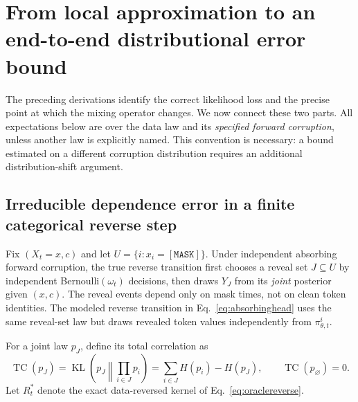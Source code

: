 \documentclass{article}
\theoremstyle{remark}\newtheorem{remark}[theorem]{Remark}
\newcommand{\KL}{\operatorname{KL}}
\newcommand{\mask}{\mathtt{[MASK]}}
\begin{document}
\section{From local approximation to an end-to-end distributional error bound}
\label{sec:endtoend}
The preceding derivations identify the correct likelihood loss and the precise point at which the mixing operator changes. We now connect these two parts. All expectations below are over the data law and its \emph{specified forward corruption}, unless another law is explicitly named. This convention is necessary: a bound estimated on a different corruption distribution requires an additional distribution-shift argument.

\subsection{Irreducible dependence error in a finite categorical reverse step}
Fix $(X_t=x,c)$ and let $U=\{i:x_i=\mask\}$. Under independent absorbing forward corruption, the true reverse transition first chooses a reveal set $J\subseteq U$ by independent Bernoulli$(\omega_t)$ decisions, then draws $Y_J$ from its \emph{joint} posterior given $(x,c)$. The reveal events depend only on mask times, not on clean token identities. The modeled reverse transition in Eq.~\eqref{eq:absorbinghead} uses the same reveal-set law but draws revealed token values independently from $\pi_{\theta,t}^i$.

For a joint law $p_J$, define its total correlation as
\begin{equation}
 \operatorname{TC}(p_J)=\KL\left(p_J\middle\Vert\prod_{i\in J}p_i\right)
 =\sum_{i\in J}H(p_i)-H(p_J),
 \qquad \operatorname{TC}(p_\varnothing)=0.
 \label{eq:tcdef}
\end{equation}
Let $R_t^*$ denote the exact data-reversed kernel of Eq.~\eqref{eq:oraclereverse}.
\end{document}

